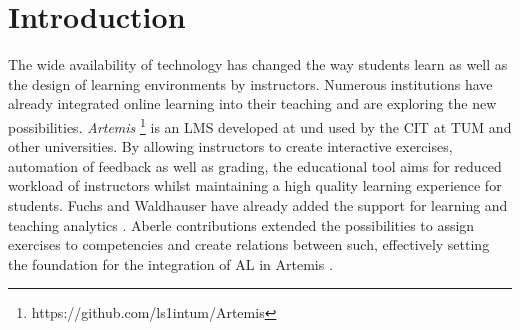 \documentclass[a4paper,12pt,twoside]{article}
\begin{document}
\setlength{\evensidemargin}{22pt}
\setlength{\oddsidemargin}{22pt}



\lstset{showspaces=false, numbers=left, frame=single, basicstyle=\small}




\fancyhead{}
\pagestyle{fancy}
\fancyhead[LE]{\slshape \leftmark}
\fancyhead[RO]{\slshape \rightmark}
\headheight=15pt

\section{Introduction}

The wide availability of technology has changed the way students learn as well as the design of learning environments by instructors. Numerous
institutions have already integrated online learning into their teaching and are exploring the new possibilities. \textit{Artemis}
\footnote{https://github.com/ls1intum/Artemis} is an \ac{LMS} developed at und used by the \ac{CIT} at \ac{TUM} and other universities.
By allowing instructors to create interactive exercises, automation of feedback as well as grading, the educational tool aims for reduced
workload of instructors whilst maintaining a high quality learning experience for students. Fuchs and Waldhauser have already added the support
for learning and teaching analytics \cite{fuchs2021,waldhauser2021}. Aberle contributions extended the possibilities to assign exercises to competencies and create relations
between such, effectively setting the foundation for the integration of \ac{AL} in Artemis \cite{aberle2022}.

\end{document}
